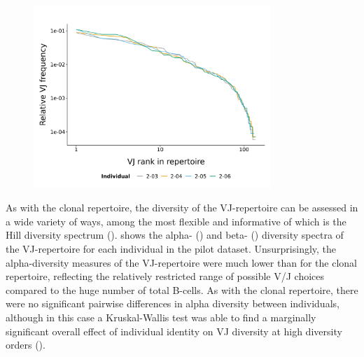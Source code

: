 \begin{figure}
\centering
\includegraphics[width=0.8\textwidth]{_Figures/png/pilot-vj-rank-frequency}
\label{fig:igseq-pilot-vj-rank-frequency}
\end{figure}

As with the clonal repertoire, the diversity of the VJ-repertoire can be assessed in a wide variety of ways, among the most flexible and informative of which is the Hill diversity spectrum ().  shows the alpha- () and beta- () diversity spectra of the VJ-repertoire for each individual in the pilot dataset. Unsurprisingly, the alpha-diversity measures of the VJ-repertoire were much lower than for the clonal repertoire, reflecting the relatively restricted range of possible V/J choices compared to the huge number of total \naive B-cells. As with the clonal repertoire, there were no significant pairwise differences in alpha diversity between individuals, although in this case a Kruskal-Wallis test was able to find a marginally significant overall effect of individual identity on VJ diversity at high diversity orders (). 

